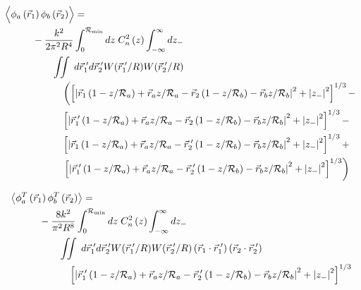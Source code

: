 \begin{equation}\label{eqn:prphase_n4}
\begin{aligned}
& \left\langle \vphantom{\hat{\phi}_{a}} \phi_{a}\left(\vec{r}_{1}\right) \phi_{b}\left(\vec{r}_{2}\right)\right\rangle = \\
&\quad\quad\quad
-\frac{k^{2}}{2\pi^{2}R^{4}} \int_{0}^{\mathcal{R}_{\rm min}} dz\;C_{n}^{2}\left(z\right)
\int_{-\infty}^{\infty} dz_{-}\\
&\quad\quad\quad\quad\quad 
\iint \; d\vec{r}^{\;\prime}_{1}d\vec{r}^{\;\prime}_{2}  
W(\vec{r}^{\;\prime}_{1}/R) W(\vec{r}^{\;\prime}_{2}/R) \\
&\quad\quad\quad\quad\quad\quad
\left(
\left[ \left\vert \vec{r}_{1}\left(1-z/\mathcal{R}_{a}\right) + \vec{r}_{a} z/\mathcal{R}_{a} - 
\vec{r}_{2}\left(1-z/\mathcal{R}_{b}\right) - \vec{r}_{b} z/\mathcal{R}_{b}\right\vert^{2} + 
\left\vert z_{-} \right\vert^{2}\right]^{1/3} -
\right. \\
& \quad\quad\quad\quad\quad\quad
\left[ \left\vert \vec{r}^{\;\prime}_{1}\left(1-z/\mathcal{R}_{a}\right) + \vec{r}_{a} z/\mathcal{R}_{a} - 
\vec{r}_{2}\left(1-z/\mathcal{R}_{b}\right) - \vec{r}_{b} z/\mathcal{R}_{b}\right\vert^{2} + 
\left\vert z_{-} \right\vert^{2}\right]^{1/3} - \\
& \quad\quad\quad\quad\quad\quad
\left[ \left\vert \vec{r}_{1}\left(1-z/\mathcal{R}_{a}\right) + \vec{r}_{a} z/\mathcal{R}_{a} - 
\vec{r}^{\;\prime}_{2}\left(1-z/\mathcal{R}_{b}\right) - \vec{r}_{b} z/\mathcal{R}_{b}\right\vert^{2} + 
\left\vert z_{-} \right\vert^{2}\right]^{1/3} + \\
& \quad\quad\quad\quad\quad\quad
\left.
\left[ \left\vert \vec{r}^{\;\prime}_{1}\left(1-z/\mathcal{R}_{a}\right) + \vec{r}_{a} z/\mathcal{R}_{a} - 
\vec{r}^{\;\prime}_{2}\left(1-z/\mathcal{R}_{b}\right) - \vec{r}_{b} z/\mathcal{R}_{b}\right\vert^{2} + 
\left\vert z_{-} \right\vert^{2}\right]^{1/3}\right)
\end{aligned}
\end{equation}

\begin{equation}\label{eqn:tphase_n4}
\begin{aligned}
&\left\langle \phi^{T}_{a}\left(\vec{r}_{1}\right) \phi^{T}_{b}\left(\vec{r}_{2}\right)\right\rangle = \\
&\quad\quad\quad
-\frac{8k^{2}}{\pi^{2}R^{8}} \int_{0}^{\mathcal{R}_{\rm min}} dz\;C_{n}^{2}\left(z\right)
\int_{-\infty}^{\infty} dz_{-} \\
&\quad\quad\quad\quad\quad 
\iint \; d\vec{r}^{\;\prime}_{1}d\vec{r}^{\;\prime}_{2} W(\vec{r}^{\;\prime}_{1}/R) W(\vec{r}^{\;\prime}_{2}/R)
\left(\vec{r}_{1} \cdot \vec{r}^{\;\prime}_{1}\right)
\left(\vec{r}_{2} \cdot \vec{r}^{\;\prime}_{2}\right)
\\
&\quad\quad\quad\quad\quad\quad
\left[ \left\vert \vec{r}^{\;\prime}_{1}\left(1-z/\mathcal{R}_{a}\right) + \vec{r}_{a} z/\mathcal{R}_{a} - 
 \vec{r}^{\;\prime}_{2}\left(1-z/\mathcal{R}_{b}\right) - \vec{r}_{b} z/\mathcal{R}_{b}\right\vert^{2} + 
\left\vert z_{-} \right\vert^{2} \right]^{1/3}
\end{aligned}
\end{equation}

